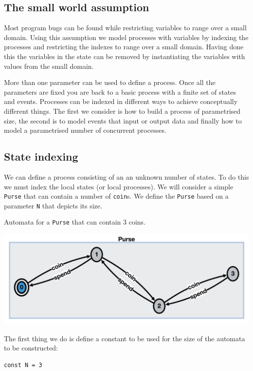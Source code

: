 \documentclass[]{article}
\begin{document}
\subsection{The small world assumption}

Most program bugs can be found while restricting variables to range over a small domain. Using this assumption we  model processes with variables by indexing the processes and restricting the indexes to range over a small domain. Having done this the variables in the state can be removed by instantiating the variables with values from the small domain.

More than one parameter can be used to define a process.  Once all the parameters are fixed you are back to a basic process with a finite set of states and events.
Processes can be indexed in different ways to achieve  conceptually different things. The first we consider is how to build a process of parametrised    size,  the second is to model events that input or output data and finally how to model a parametrised number of concurrent processes.

\subsection{State indexing}

We can define a process consisting of an  an unknown number of states. To do this we must index the local states (or local processes).
We will consider a simple \verb|Purse| that can contain a number of \verb|coin|s. We define the \verb|Purse| based on a parameter \verb|N| that depicts its size.
\noindent\begin{center}
Automata for a \verb|Purse| that can contain 3 coins.

\includegraphics[scale=0.15]{Purse.jpg} \end{center}


The first thing we do is define a constant to be used for the size of the automata to be constructed:

\hspace{0.5in}\verb$const N = 3$
\end{document}
